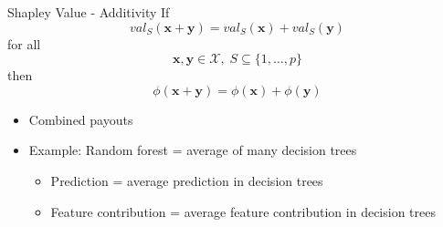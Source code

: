 \begin{frame}{Shapley Value - Additivity}
	If
	\begin{equation}
		val_S(\bm{x} + \bm{y}) = val_S(\bm{x}) + val_S(\bm{y})
	\end{equation}
	for all
	\begin{equation*}
		\bm{x}, \bm{y} \in \mathcal{X},\; S\subseteq\{1,\ldots, p\}
	\end{equation*}
	then
	\begin{equation*}
		\phi(\bm{x} + \bm{y})=\phi(\bm{x}) + \phi(\bm{y})
	\end{equation*}
	\begin{itemize}
		\item Combined payouts
		\item Example: Random forest = average of many decision trees
		\begin{itemize}
			\item Prediction = average prediction in decision trees
			\item Feature contribution = average feature contribution in decision trees
		\end{itemize}
	\end{itemize}
\end{frame}